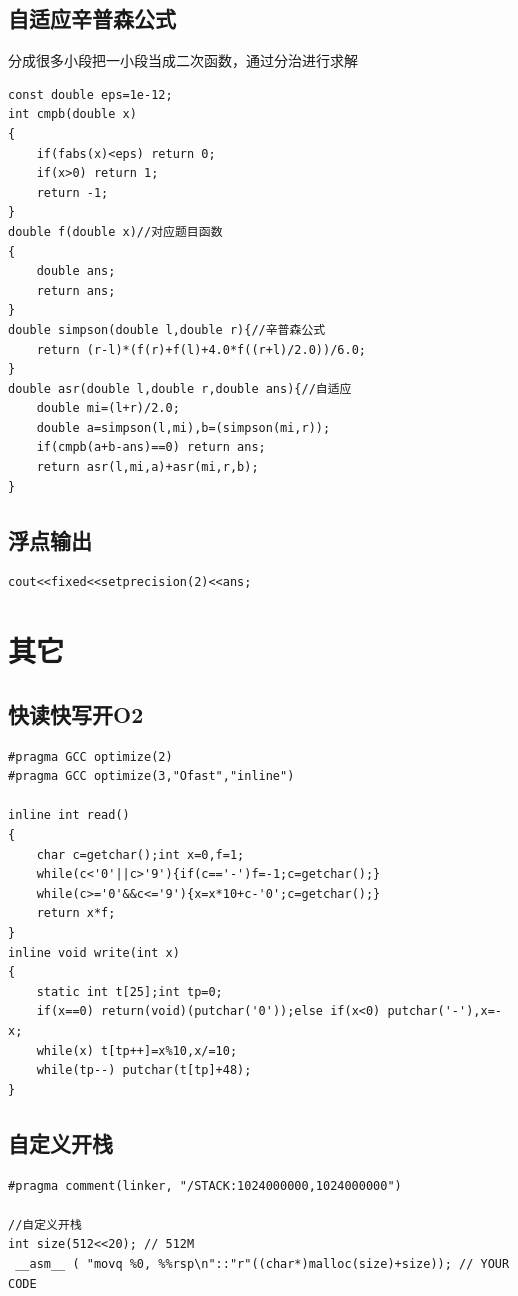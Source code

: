 \documentclass[12pt, a4paper, oneside]{ctexart}
\begin{document}
\newpage 
\subsection{自适应辛普森公式} 
分成很多小段把一小段当成二次函数，通过分治进行求解
\begin{lstlisting}
const double eps=1e-12;
int cmpb(double x)
{
    if(fabs(x)<eps) return 0;
    if(x>0) return 1;
    return -1;
}
double f(double x)//对应题目函数 
{
	double ans;
	return ans;
}
double simpson(double l,double r){//辛普森公式 
	return (r-l)*(f(r)+f(l)+4.0*f((r+l)/2.0))/6.0;
}
double asr(double l,double r,double ans){//自适应 
	double mi=(l+r)/2.0;
	double a=simpson(l,mi),b=(simpson(mi,r));
	if(cmpb(a+b-ans)==0) return ans;
	return asr(l,mi,a)+asr(mi,r,b);
}
\end{lstlisting}

\newpage 
\subsection{浮点输出} 
\begin{lstlisting}
cout<<fixed<<setprecision(2)<<ans;
\end{lstlisting}

\newpage 
\section{其它} 
\subsection{快读快写开O2} 
\begin{lstlisting}
#pragma GCC optimize(2)
#pragma GCC optimize(3,"Ofast","inline")

inline int read()
{
    char c=getchar();int x=0,f=1;
    while(c<'0'||c>'9'){if(c=='-')f=-1;c=getchar();}
    while(c>='0'&&c<='9'){x=x*10+c-'0';c=getchar();}
    return x*f;
}
inline void write(int x)
{
	static int t[25];int tp=0;
	if(x==0) return(void)(putchar('0'));else if(x<0) putchar('-'),x=-x;
	while(x) t[tp++]=x%10,x/=10;
	while(tp--) putchar(t[tp]+48);
}
\end{lstlisting}

\subsection{自定义开栈} 
\begin{lstlisting}
#pragma comment(linker, "/STACK:1024000000,1024000000")

//自定义开栈
int size(512<<20); // 512M
 __asm__ ( "movq %0, %%rsp\n"::"r"((char*)malloc(size)+size)); // YOUR CODE

\end{lstlisting}
\end{document}
